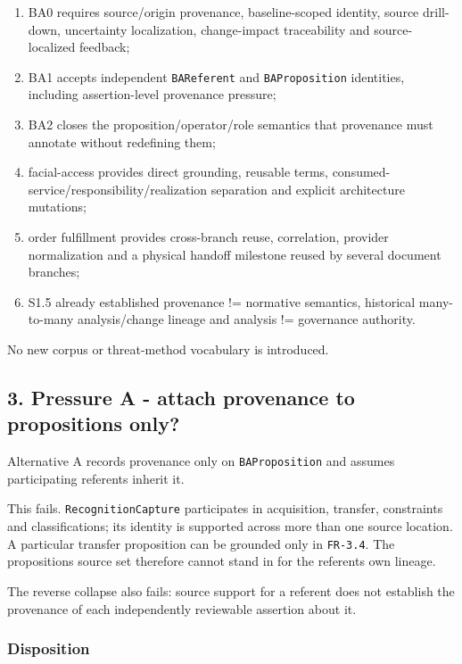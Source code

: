 \documentclass[11pt,a4paper]{article}
\providecommand{\tightlist}{\setlength{\itemsep}{0pt}\setlength{\parskip}{0pt}}
\begin{document}
\begin{enumerate}
\def\labelenumi{\arabic{enumi}.}
\tightlist
\item
  BA0 requires source/origin provenance, baseline-scoped identity, source drill-down, uncertainty localization, change-impact traceability and source-localized feedback;
\item
  BA1 accepts independent \texttt{BAReferent} and \texttt{BAProposition} identities, including assertion-level provenance pressure;
\item
  BA2 closes the proposition/operator/role semantics that provenance must annotate without redefining them;
\item
  facial-access provides direct grounding, reusable terms, consumed-service/responsibility/realization separation and explicit architecture mutations;
\item
  order fulfillment provides cross-branch reuse, correlation, provider normalization and a physical handoff milestone reused by several document branches;
\item
  S1.5 already established provenance != normative semantics, historical many-to-many analysis/change lineage and analysis != governance authority.
\end{enumerate}

No new corpus or threat-method vocabulary is introduced.

\subsection{3. Pressure A - attach provenance to propositions only?}\label{3-pressure-a---attach-provenance-to-propositions-only}

Alternative A records provenance only on \texttt{BAProposition} and assumes participating referents inherit it.

This fails. \texttt{RecognitionCapture} participates in acquisition, transfer, constraints and classifications; its identity is supported across more than one source location. A particular transfer proposition can be grounded only in \texttt{FR-3.4}. The proposition\textquotesingle s source set therefore cannot stand in for the referent\textquotesingle s own lineage.

The reverse collapse also fails: source support for a referent does not establish the provenance of each independently reviewable assertion about it.

\subsubsection{Disposition}\label{disposition}
\end{document}
